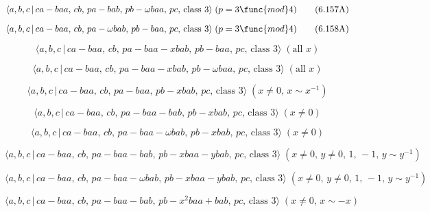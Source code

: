 \documentclass[10pt]{article}
\begin{document}
\begin{equation}
\langle a,b,c\,|\,ca-baa,\,cb,\,pa-bab,\,pb-\omega baa,\,pc,\,\text{class }%
3\rangle\;(p=3 \func{mod} 4)  \tag{6.157A}
\end{equation}

\begin{equation}
\langle a,b,c\,|\,ca-baa,\,cb,\,pa-\omega bab,\,pb-baa,\,pc,\,\text{class }%
3\rangle\;(p=3 \func{mod} 4)  \tag{6.158A}
\end{equation}

\begin{equation}
\langle a,b,c\,|\,ca-baa,\,cb,\,pa-baa-xbab,\,pb-baa,\,pc,\,\text{class }%
3\rangle\;(\text{all }x)  \tag{6.159}
\end{equation}

\begin{equation}
\langle a,b,c\,|\,ca-baa,\,cb,\,pa-baa-xbab,\,pb-\omega baa,\,pc,\,\text{
class }3\rangle\;(\text{all }x)  \tag{6.160}
\end{equation}

\begin{equation}
\langle a,b,c\,|\,ca-baa,\,cb,\,pa-baa,\,pb-xbab,\,pc,\,\text{class }%
3\rangle\;(x \neq 0,\, x\sim x^{-1})  \tag{6.160A}
\end{equation}

\begin{equation}
\langle a,b,c\,|\,ca-baa,\,cb,\,pa-baa-bab,\,pb-xbab,\,pc,\,\text{class }%
3\rangle\;(x \neq 0)  \tag{6.161}
\end{equation}

\begin{equation}
\langle a,b,c\,|\,ca-baa,\,cb,\,pa-baa-\omega bab,\,pb-xbab,\,pc,\,\text{
class }3\rangle\;(x \neq 0)  \tag{6.162}
\end{equation}

\begin{equation}
\langle a,b,c\,|\,ca-baa,\,cb,\,pa-baa-bab,\,pb-xbaa-ybab,\,pc,\,\text{
class }3\rangle\;(x \neq 0,\, y \neq 0,\,1,\,-1,\, y\sim y^{-1})  \tag{6.163}
\end{equation}

\begin{equation}
\langle a,b,c\,|\,ca-baa,\,cb,\,pa-baa-\omega bab,\,pb-xbaa-ybab,\,pc,\,%
\text{class }3\rangle\;(x \neq 0,\, y \neq 0,\,1,\,-1,\, y\sim y^{-1}) 
\tag{6.164}
\end{equation}

\begin{equation}
\langle a,b,c\,|\,ca-baa,\,cb,\,pa-baa-bab,\,pb-x^2baa+bab,\,pc,\,\text{
class }3\rangle\;(x \neq 0,\, x\sim -x)  \tag{6.165}
\end{equation}
\end{document}

